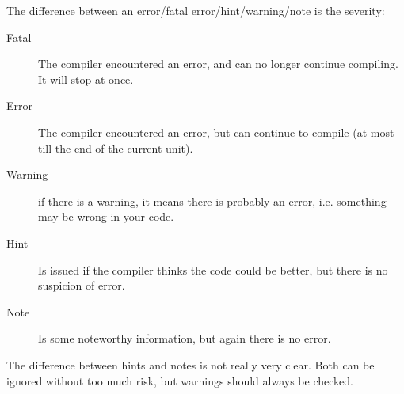 %
%
The difference between an error/fatal error/hint/warning/note is the severity:
\begin{description}
\item[Fatal] The compiler encountered an error, and can no longer continue
compiling. It will stop at once.
\item[Error] The compiler encountered an error, but can continue to compile
(at most till the end of the current unit).
\item[Warning] if there is a warning, it means there is probably an error,
i.e. something may be wrong in your code.
\item[Hint] Is issued if the compiler thinks the code could be better, but
there is no suspicion of error.
\item[Note] Is some noteworthy information, but again there is no error.
\end{description}
The difference between hints and notes is not really very clear. Both can
be ignored without too much risk, but warnings should always be checked.


%
%
